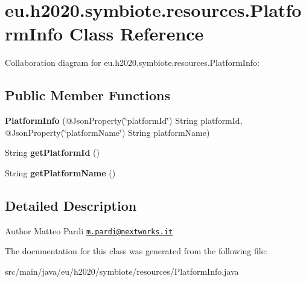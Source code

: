 \hypertarget{classeu_1_1h2020_1_1symbiote_1_1resources_1_1PlatformInfo}{}\section{eu.\+h2020.\+symbiote.\+resources.\+Platform\+Info Class Reference}
\label{classeu_1_1h2020_1_1symbiote_1_1resources_1_1PlatformInfo}


Collaboration diagram for eu.\+h2020.\+symbiote.\+resources.\+Platform\+Info\+:
\subsection*{Public Member Functions}
\begin{DoxyCompactItemize}
\item 
\mbox{\label{classeu_1_1h2020_1_1symbiote_1_1resources_1_1PlatformInfo_a149aa1b3c51d25544dac80859dcb5067}} 
{\bfseries Platform\+Info} (@Json\+Property(\char`\"{}platform\+Id\char`\"{}) String platform\+Id, @Json\+Property(\char`\"{}platform\+Name\char`\"{}) String platform\+Name)
\item 
\mbox{\label{classeu_1_1h2020_1_1symbiote_1_1resources_1_1PlatformInfo_a3452a4a57b18531d751a2146d81e423a}} 
String {\bfseries get\+Platform\+Id} ()
\item 
\mbox{\label{classeu_1_1h2020_1_1symbiote_1_1resources_1_1PlatformInfo_aad5f7c9ca6ccf0e4a119c33422e7989e}} 
String {\bfseries get\+Platform\+Name} ()
\end{DoxyCompactItemize}


\subsection{Detailed Description}
\begin{DoxyAuthor}{Author}
Matteo Pardi \href{mailto:m.pardi@nextworks.it}{\tt m.\+pardi@nextworks.\+it} 
\end{DoxyAuthor}


The documentation for this class was generated from the following file\+:\begin{DoxyCompactItemize}
\item 
src/main/java/eu/h2020/symbiote/resources/Platform\+Info.\+java\end{DoxyCompactItemize}
